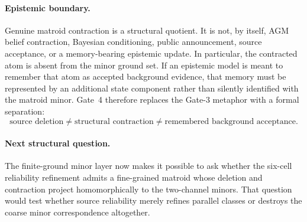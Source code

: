 \paragraph{Epistemic boundary.}
Genuine matroid contraction is a structural quotient. It is not, by itself, AGM
belief contraction, Bayesian conditioning, public announcement, source acceptance,
or a memory-bearing epistemic update. In particular, the contracted atom is absent
from the minor ground set. If an epistemic model is meant to remember that atom as
accepted background evidence, that memory must be represented by an additional
state component rather than silently identified with the matroid minor. Gate~4
therefore replaces the Gate-3 metaphor with a formal separation:
\[
  \text{source deletion}
  \neq
  \text{structural contraction}
  \neq
  \text{remembered background acceptance}.
\]

\paragraph{Next structural question.}
The finite-ground minor layer now makes it possible to ask whether the six-cell
reliability refinement admits a fine-grained matroid whose deletion and contraction
project homomorphically to the two-channel minors. That question would test whether
source reliability merely refines parallel classes or destroys the coarse minor
correspondence altogether.
